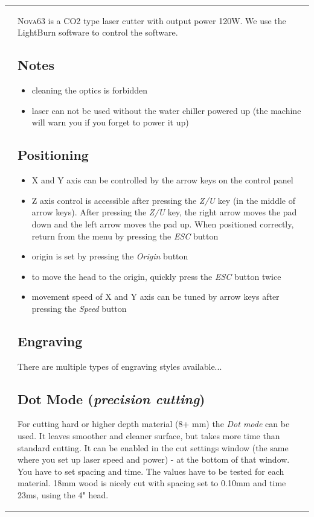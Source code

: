 \documentclass[fleqn]{article}
\begin{document}
\begin{tabular}{@{}
                         p{}%
		         @{\hspace{.04\columnwidth}}%
		         p{}%
		         @{}%
}
\par\bigskip

&\large
\lettrine[lines=2]{N}{ova63} is a CO2 type laser cutter with output power 120W. We use the LightBurn software to control the software.

\subsection{Notes}
\begin{itemize}[noitemsep,topsep=0pt]
	\item cleaning the optics is forbidden
	\item laser can not be used without the water chiller powered up (the machine will warn you if you forget to power it up)
\end{itemize}

\subsection{Positioning}
\begin{itemize}[noitemsep,topsep=0pt]
	\item X and Y axis can be controlled by the arrow keys on the control panel 
	\item Z axis control is accessible after pressing the \textit{Z/U} key (in the middle of arrow keys). After pressing the \textit{Z/U} key, the right arrow moves the pad down and the left arrow moves the pad up. When positioned correctly, return from the menu by pressing the \textit{ESC} button
	\item origin is set by pressing the \textit{Origin} button
	\item to move the head to the origin, quickly press the \textit{ESC} button twice
	\item movement speed of X and Y axis can be tuned by arrow keys after pressing the \textit{Speed} button
\end{itemize}

\subsection{Engraving}
There are multiple types of engraving styles available...

\subsection{Dot Mode (\textit{precision cutting})}
For cutting hard or higher depth material (8+ mm) the \textit{Dot mode} can be used. It leaves smoother and cleaner surface, but takes more time than standard cutting. It can be enabled in the cut settings window (the same where you set up laser speed and power) - at the bottom of that window. You have to set spacing and time. The values have to be tested for each material. 18mm wood is nicely cut with spacing set to 0.10mm and time 23ms, using the 4" head.




\end{tabular}
\end{document}
